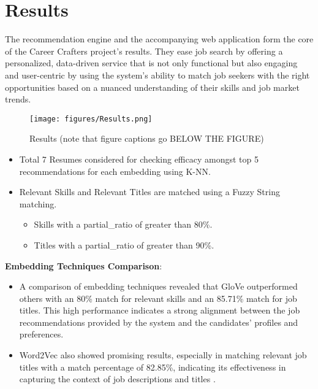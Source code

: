 \documentclass[a4paper,10pt]{article}
\begin{document}
\section{Results}

The recommendation engine and the accompanying web application form the core of the Career Crafters project's results. They ease job search by offering a personalized, data-driven service that is not only functional but also engaging and user-centric by using the system's ability to match job seekers with the right opportunities based on a nuanced understanding of their skills and job market trends.

 \begin{figure}[ht]
    \centering
    \texttt{[image: figures/Results.png]}
    \caption{Results (note that figure captions go BELOW THE FIGURE)}
    \label{fig_results}
    \end{figure}

\begin{itemize}
    \item Total 7 Resumes considered for checking efficacy amongst top 5 recommendations for each embedding using K-NN.

    \item  Relevant Skills and Relevant Titles are matched using a Fuzzy String matching.
    \begin{itemize}
    	\item Skills with a partial\_ratio of greater than 80\%.
    	\item Titles with a partial\_ratio of greater than 90\%.
    \end{itemize}
\end{itemize}

\textbf{Embedding Techniques Comparison}:
\begin{itemize}
 \item A comparison of embedding techniques revealed that GloVe outperformed others with an 80\% match for relevant skills and an 85.71\% match for job titles. This high performance indicates a strong alignment between the job recommendations provided by the system and the candidates' profiles and preferences.

 \item Word2Vec also showed promising results, especially in matching relevant job titles with a match percentage of 82.85\%, indicating its effectiveness in capturing the context of job descriptions and titles .
\end{itemize}
\end{document}
